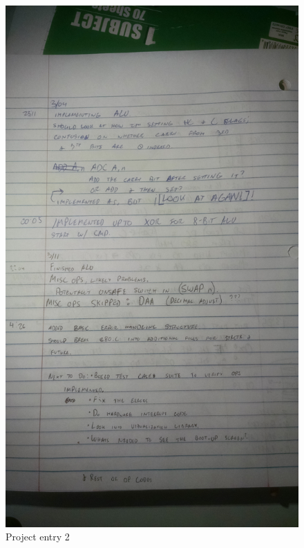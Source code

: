 \documentclass{article}
\begin{document}
     \begin{figure}[h]
        \centering
        \includegraphics[width=12cm, keepaspectratio]{entry_2}
        \caption{Project entry 2}
    \end{figure}      
\end{document}
